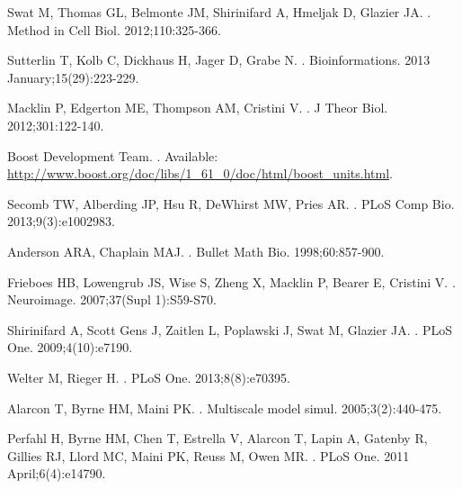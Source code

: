 \documentclass[10pt,letterpaper]{article}
\begin{document}
\begin{thebibliography}{10}
Swat M, Thomas GL, Belmonte JM, Shirinifard A, Hmeljak D, Glazier JA.
.
\newblock Method in Cell Biol. 2012;110:325-366.

Sutterlin T, Kolb C, Dickhaus H, Jager D, Grabe N.
.
\newblock Bioinformations. 2013 January;15(29):223-229.

Macklin P, Edgerton ME, Thompson AM, Cristini V.
.
\newblock J Theor Biol. 2012;301:122-140.

Boost Development Team.
.
\newblock Available: \url{http://www.boost.org/doc/libs/1_61_0/doc/html/boost_units.html}.

Secomb TW, Alberding JP, Hsu R, DeWhirst MW, Pries AR.
.
\newblock PLoS Comp Bio. 2013;9(3):e1002983.

Anderson ARA, Chaplain MAJ.
.
\newblock Bullet Math Bio. 1998;60:857-900.

Frieboes HB, Lowengrub JS, Wise S, Zheng X, Macklin P, Bearer E, Cristini V.
.
\newblock Neuroimage. 2007;37(Supl 1):S59-S70.

Shirinifard A, Scott Gens J, Zaitlen L, Poplawski J, Swat M, Glazier JA.
.
\newblock PLoS One. 2009;4(10):e7190.

Welter M, Rieger H.
.
\newblock PLoS One. 2013;8(8):e70395.

Alarcon T, Byrne HM, Maini PK.
.
\newblock Multiscale model simul. 2005;3(2):440-475.

Perfahl H, Byrne HM, Chen T, Estrella V, Alarcon T, Lapin A, Gatenby R, Gillies RJ, Llord MC, Maini PK, Reuss M, Owen MR.
.
\newblock PLoS One. 2011 April;6(4):e14790.


\end{thebibliography}
\end{document}
